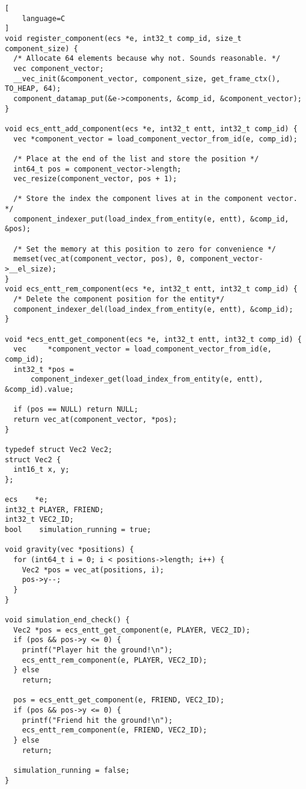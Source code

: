 \begin{lstlisting}[
    language=C
]
void register_component(ecs *e, int32_t comp_id, size_t component_size) {
  /* Allocate 64 elements because why not. Sounds reasonable. */
  vec component_vector;
  __vec_init(&component_vector, component_size, get_frame_ctx(), TO_HEAP, 64);
  component_datamap_put(&e->components, &comp_id, &component_vector);
}

void ecs_entt_add_component(ecs *e, int32_t entt, int32_t comp_id) {
  vec *component_vector = load_component_vector_from_id(e, comp_id);

  /* Place at the end of the list and store the position */
  int64_t pos = component_vector->length;
  vec_resize(component_vector, pos + 1);

  /* Store the index the component lives at in the component vector. */
  component_indexer_put(load_index_from_entity(e, entt), &comp_id, &pos);

  /* Set the memory at this position to zero for convenience */
  memset(vec_at(component_vector, pos), 0, component_vector->__el_size);
}
void ecs_entt_rem_component(ecs *e, int32_t entt, int32_t comp_id) {
  /* Delete the component position for the entity*/
  component_indexer_del(load_index_from_entity(e, entt), &comp_id);
}

void *ecs_entt_get_component(ecs *e, int32_t entt, int32_t comp_id) {
  vec     *component_vector = load_component_vector_from_id(e, comp_id);
  int32_t *pos =
      component_indexer_get(load_index_from_entity(e, entt), &comp_id).value;

  if (pos == NULL) return NULL;
  return vec_at(component_vector, *pos);
}

typedef struct Vec2 Vec2;
struct Vec2 {
  int16_t x, y;
};

ecs    *e;
int32_t PLAYER, FRIEND;
int32_t VEC2_ID;
bool    simulation_running = true;

void gravity(vec *positions) {
  for (int64_t i = 0; i < positions->length; i++) {
    Vec2 *pos = vec_at(positions, i);
    pos->y--;
  }
}

void simulation_end_check() {
  Vec2 *pos = ecs_entt_get_component(e, PLAYER, VEC2_ID);
  if (pos && pos->y <= 0) {
    printf("Player hit the ground!\n");
    ecs_entt_rem_component(e, PLAYER, VEC2_ID);
  } else
    return;

  pos = ecs_entt_get_component(e, FRIEND, VEC2_ID);
  if (pos && pos->y <= 0) {
    printf("Friend hit the ground!\n");
    ecs_entt_rem_component(e, FRIEND, VEC2_ID);
  } else
    return;

  simulation_running = false;
}


\end{lstlisting}
